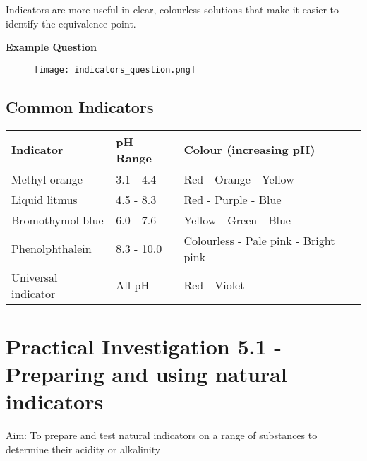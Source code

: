 		Indicators are more useful in clear, colourless solutions that make it easier to identify the equivalence point.

		\textbf{Example Question}

			\begin{figure}[H]
				\centering
				\texttt{[image: indicators\_question.png]}
			\end{figure}

		\subsection{Common Indicators}
		
			\begin{table}[H]
				\centering
				\begin{tabular}{p{4cm}| p{5cm} | p{5cm}}
					Indicator	& pH Range	& Colour (increasing pH) \\ \hline
					Methyl orange	& 3.1 - 4.4	& Red - Orange - Yellow \\
					Liquid litmus	& 4.5 - 8.3	& Red - Purple - Blue \\
					Bromothymol blue& 6.0 - 7.6	& Yellow - Green - Blue \\
					Phenolphthalein	& 8.3 - 10.0	& Colourless - Pale pink - Bright pink \\
					Universal indicator & All pH	& Red - Violet
				\end{tabular}
			\end{table}

\section{Practical Investigation 5.1 - Preparing and using natural indicators}

	Aim: To prepare and test natural indicators on a range of substances to determine their acidity or alkalinity

